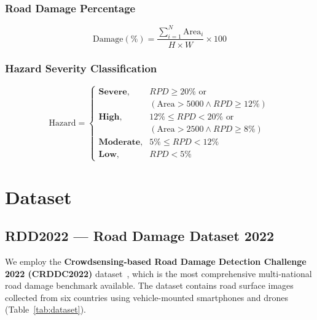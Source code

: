 \documentclass[conference]{IEEEtran}
\begin{document}
\subsubsection{Road Damage Percentage}
\begin{equation}
\text{Damage}(\%) = \frac{\sum_{i=1}^{N} \text{Area}_i}{H \times W} \times 100
\end{equation}

\subsubsection{Hazard Severity Classification}
\begin{equation}
\label{eq:hazard}
\text{Hazard} = \begin{cases}
\textbf{Severe}, & RPD \geq 20\% \text{ or} \\
                 & (\text{Area} > 5000 \wedge RPD \geq 12\%) \\[3pt]
\textbf{High},   & 12\% \leq RPD < 20\% \text{ or} \\
                 & (\text{Area} > 2500 \wedge RPD \geq 8\%) \\[3pt]
\textbf{Moderate}, & 5\% \leq RPD < 12\% \\[3pt]
\textbf{Low},    & RPD < 5\%
\end{cases}
\end{equation}


\section{Dataset}
\label{sec:dataset}

\subsection{RDD2022 --- Road Damage Dataset 2022}
We employ the \textbf{Crowdsensing-based Road Damage Detection Challenge 2022 (CRDDC2022)} dataset~\cite{arya2022rdd2022}, which is the most comprehensive multi-national road damage benchmark available. The dataset contains road surface images collected from six countries using vehicle-mounted smartphones and drones (Table~\ref{tab:dataset}).
\end{document}
